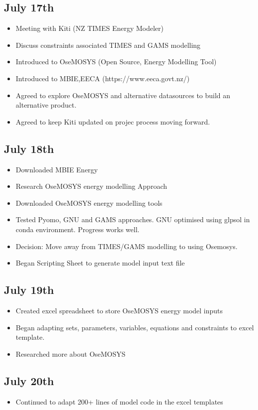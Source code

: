 \documentclass[12pt]{article}
\begin{document}
\subsection{July 17th}
\begin{itemize}
	\item Meeting with Kiti (NZ TIMES Energy Modeler)
	\item Discuss constraints associated TIMES and GAMS modelling
	\item Introduced to OseMOSYS (Open Source, Energy Modelling Tool)
	\item Introduced to MBIE,EECA (https://www.eeca.govt.nz/)
	\item Agreed to explore OseMOSYS and alternative datasources to build an alternative product.
	\item Agreed to keep Kiti updated on projec process moving forward.
\end{itemize}
\subsection{July 18th}
\begin{itemize}
	\item Downloaded MBIE Energy 
	\item Research OseMOSYS energy modelling Approach
	\item Downloaded OseMOSYS energy modelling tools
	\item Tested Pyomo, GNU and GAMS approaches. GNU optimised using glpsol in conda environment. Progress works well.
	\item Decision: Move away from TIMES/GAMS modelling to using Osemosys.
	\item Began Scripting Sheet to generate model input text file
\end{itemize}
\subsection{July 19th}
\begin{itemize}
	\item Created excel spreadsheet to store OseMOSYS energy model inputs
	\item Began adapting sets, parameters, variables, equations and constraints to excel template.
	\item Researched more about OseMOSYS
\end{itemize}
\subsection{July 20th}
\begin{itemize}
	\item Continued to adapt 200+ lines of model code in the excel templates
\end{itemize}
\end{document}
